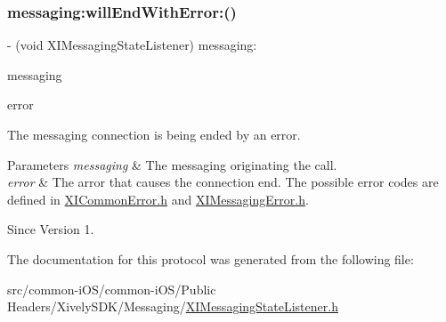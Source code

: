 \subsubsection{\texorpdfstring{messaging\+:will\+End\+With\+Error\+:()}{messaging:willEndWithError:()}}
{\footnotesize\ttfamily -\/ (void X\+I\+Messaging\+State\+Listener) messaging\+: \begin{DoxyParamCaption}\item[{(id$<$ X\+I\+Messaging $>$)}]{messaging }\item[{willEndWithError:(N\+S\+Error $\ast$)}]{error }\end{DoxyParamCaption}}



The messaging connection is being ended by an error. 


\begin{DoxyParams}{Parameters}
{\em messaging} & The messaging originating the call. \\
\hline
{\em error} & The arror that causes the connection end. The possible error codes are defined in \hyperlink{_x_i_common_error_8h}{X\+I\+Common\+Error.\+h} and \hyperlink{_x_i_messaging_error_8h}{X\+I\+Messaging\+Error.\+h}. \\
\hline
\end{DoxyParams}
\begin{DoxySince}{Since}
Version 1. 
\end{DoxySince}


The documentation for this protocol was generated from the following file\+:\begin{DoxyCompactItemize}
\item 
src/common-\/i\+O\+S/common-\/i\+O\+S/\+Public Headers/\+Xively\+S\+D\+K/\+Messaging/\hyperlink{_x_i_messaging_state_listener_8h}{X\+I\+Messaging\+State\+Listener.\+h}\end{DoxyCompactItemize}
